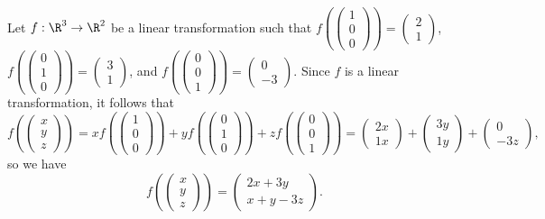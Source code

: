 \documentclass[12pt]{article}
\begin{document}
\begin{exmp}
    Let $f: \R^3 \to \R^2$ be a linear transformation such that $f\left(\begin{pmatrix}
        1 \\ 0 \\ 0
    \end{pmatrix}\right) = \begin{pmatrix}
        2 \\ 1
    \end{pmatrix}$, $f\left(\begin{pmatrix}
        0 \\ 1 \\ 0
    \end{pmatrix}\right) = \begin{pmatrix}
        3 \\ 1
    \end{pmatrix}$, and $f\left(\begin{pmatrix}
        0 \\ 0 \\ 1
    \end{pmatrix}\right) = \begin{pmatrix}
        0 \\ -3
    \end{pmatrix}$. Since $f$ is a linear transformation, it follows that \[f\left(\begin{pmatrix}
        x \\ y \\ z
    \end{pmatrix}\right) = xf\left(\begin{pmatrix}
        1 \\ 0 \\ 0
    \end{pmatrix}\right) + yf\left(\begin{pmatrix}
        0 \\ 1 \\ 0
    \end{pmatrix}\right) + zf\left(\begin{pmatrix}
        0 \\ 0 \\ 1
    \end{pmatrix}\right) = \begin{pmatrix}
        2x \\ 1x
    \end{pmatrix} + \begin{pmatrix}
        3y \\ 1y
    \end{pmatrix} + \begin{pmatrix}
        0 \\ -3z
    \end{pmatrix},\] so we have \[f\left(\begin{pmatrix}
        x \\ y \\ z
    \end{pmatrix}\right) = \begin{pmatrix}
        2x + 3y \\ x + y - 3z
    \end{pmatrix}.\]
\end{exmp}
\end{document}
